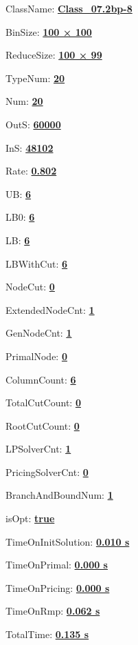 \documentclass[11pt]{article}
\begin{document}
\pagestyle{empty}


ClassName: \underline{\textbf{Class_07.2bp-8}}
\par
BinSize: \underline{\textbf{100 × 100}}
\par
ReduceSize: \underline{\textbf{100 × 99}}
\par
TypeNum: \underline{\textbf{20}}
\par
Num: \underline{\textbf{20}}
\par
OutS: \underline{\textbf{60000}}
\par
InS: \underline{\textbf{48102}}
\par
Rate: \underline{\textbf{0.802}}
\par
UB: \underline{\textbf{6}}
\par
LB0: \underline{\textbf{6}}
\par
LB: \underline{\textbf{6}}
\par
LBWithCut: \underline{\textbf{6}}
\par
NodeCut: \underline{\textbf{0}}
\par
ExtendedNodeCnt: \underline{\textbf{1}}
\par
GenNodeCnt: \underline{\textbf{1}}
\par
PrimalNode: \underline{\textbf{0}}
\par
ColumnCount: \underline{\textbf{6}}
\par
TotalCutCount: \underline{\textbf{0}}
\par
RootCutCount: \underline{\textbf{0}}
\par
LPSolverCnt: \underline{\textbf{1}}
\par
PricingSolverCnt: \underline{\textbf{0}}
\par
BranchAndBoundNum: \underline{\textbf{1}}
\par
isOpt: \underline{\textbf{true}}
\par
TimeOnInitSolution: \underline{\textbf{0.010 s}}
\par
TimeOnPrimal: \underline{\textbf{0.000 s}}
\par
TimeOnPricing: \underline{\textbf{0.000 s}}
\par
TimeOnRmp: \underline{\textbf{0.062 s}}
\par
TotalTime: \underline{\textbf{0.135 s}}
\par
\newpage


\end{document}
